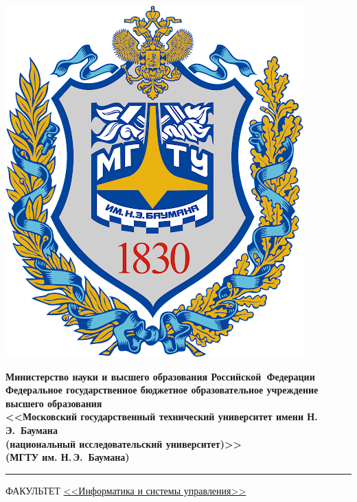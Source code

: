 \documentclass[14pt]{extarticle}
\begin{document}
\begin{titlepage}

\noindent
\begin{minipage}{0.15\textwidth}
    \includegraphics[width=\textwidth]{resources/bmstu-logo.png}
\end{minipage}
\noindent
\begin{minipage}{0.80\textwidth}
    \bfseries\small\centering
    Министерство науки и высшего образования Российской~Федерации
    \\
    Федеральное государственное бюджетное образовательное учреждение высшего
    образования
    \\
    <<Московский государственный технический университет имени Н.\,Э.~Баумана
    \\
    (национальный исследовательский университет)>>
    \\
    (МГТУ им. Н.\,Э.~Баумана)
\end{minipage}

\bigskip
\noindent
\rule{\textwidth}{3pt}

\noindent
ФАКУЛЬТЕТ
\uline{<<Информатика и системы управления>> \hfill}


\end{titlepage}
\end{document}
